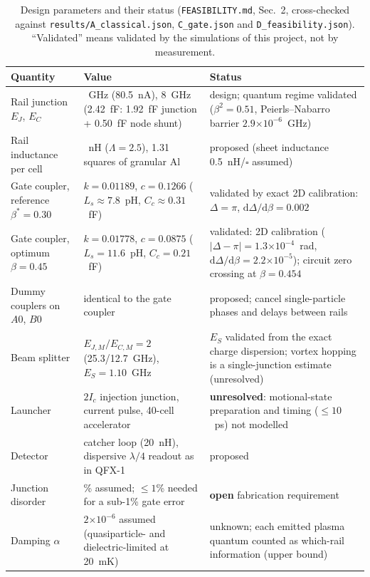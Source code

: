 \documentclass[10pt,twocolumn,letterpaper]{article}
\newcommand{\ee}[1]{\ensuremath{\times10^{#1}}}
\newcommand{\ud}{\mathrm{d}}
\newcommand{\file}[1]{\texttt{#1}}
\begin{document}
\begin{table}[t]
\centering\footnotesize
\caption{Design parameters and their status (\file{FEASIBILITY.\allowbreak{}md}, Sec.~2, cross-checked against
\file{results/\allowbreak{}A\_\allowbreak{}classical.\allowbreak{}json}, \file{C\_\allowbreak{}gate.\allowbreak{}json} and \file{D\_\allowbreak{}feasibility.\allowbreak{}json}). ``Validated'' means validated
by the simulations of this project, not by measurement.}
\label{tab:params}
\begin{tabularx}{\textwidth}{@{}>{\raggedright\arraybackslash}p{}>{\raggedright\arraybackslash}p{}>{\raggedright\arraybackslash}X@{}}
\toprule
Quantity & Value & Status\\
\midrule
Rail junction $E_J$, $E_C$ & 40~GHz (80.5~nA), 8~GHz (2.42~fF: 1.92~fF junction + 0.50~fF node shunt) & design; quantum regime validated ($\beta^2=0.51$, Peierls--Nabarro barrier $2.9\ee{-6}$~GHz)\\
Rail inductance per cell & 0.654~nH ($\Lambda=2.5$), 1.31 squares of granular Al & proposed (sheet inductance 0.5~nH/$\square$ assumed)\\
Gate coupler, reference $\beta^*=0.30$ & $k=0.01189$, $c=0.1266$ ($L_s\approx7.8$~pH, $C_c\approx0.31$~fF) & validated by exact 2D calibration: $\Delta=\pi$, $\ud\Delta/\ud\beta=0.002$\\
Gate coupler, optimum $\beta=0.45$ & $k=0.01778$, $c=0.0875$ ($L_s=11.6$~pH, $C_c=0.21$~fF) & validated: 2D calibration ($|\Delta-\pi|=1.3\ee{-4}$~rad, $\ud\Delta/\ud\beta=2.2\ee{-5}$); circuit zero crossing at $\beta=0.454$\\
Dummy couplers on $A0$, $B0$ & identical to the gate coupler & proposed; cancel single-particle phases and delays between rails\\
Beam splitter & $E_{J,M}/E_{C,M}=2$ (25.3/12.7~GHz), $E_S=1.10$~GHz & $E_S$ validated from the exact charge dispersion; vortex hopping is a single-junction estimate (unresolved)\\
Launcher & $2I_c$ injection junction, current pulse, 40-cell accelerator & \textbf{unresolved}: motional-state preparation and timing ($\le10$~ps) not modelled\\
Detector & catcher loop (20~nH), dispersive $\lambda/4$ readout as in QFX-1 & proposed\\
Junction disorder & 2\% assumed; $\le1$\% needed for a sub-1\% gate error & \textbf{open} fabrication requirement\\
Damping $\alpha$ & $2\ee{-6}$ assumed (quasiparticle- and dielectric-limited at 20~mK) & unknown; each emitted plasma quantum counted as which-rail information (upper bound)\\
\bottomrule
\end{tabularx}
\end{table}
\end{document}
